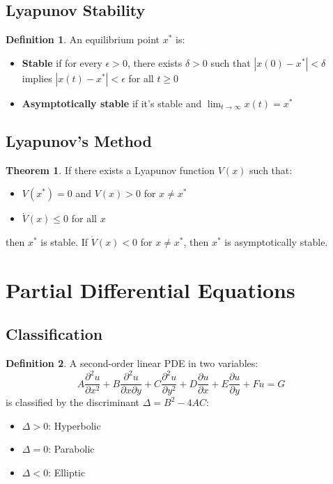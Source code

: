 \documentclass[11pt]{article}
\theoremstyle{definition}
\newtheorem{definition}{Definition}[section]
\newtheorem{theorem}{Theorem}[section]
\begin{document}
\subsection{Lyapunov Stability}
\begin{definition}
An equilibrium point $x^*$ is:
\begin{itemize}
    \item \textbf{Stable} if for every $\epsilon > 0$, there exists $\delta > 0$ such that $|x(0) - x^*| < \delta$ implies $|x(t) - x^*| < \epsilon$ for all $t \geq 0$
    \item \textbf{Asymptotically stable} if it's stable and $\lim_{t \to \infty} x(t) = x^*$
\end{itemize}
\end{definition}

\subsection{Lyapunov's Method}
\begin{theorem}
If there exists a Lyapunov function $V(x)$ such that:
\begin{itemize}
    \item $V(x^*) = 0$ and $V(x) > 0$ for $x \neq x^*$
    \item $\dot{V}(x) \leq 0$ for all $x$
\end{itemize}
then $x^*$ is stable. If $\dot{V}(x) < 0$ for $x \neq x^*$, then $x^*$ is asymptotically stable.
\end{theorem}

\section{Partial Differential Equations}

\subsection{Classification}
\begin{definition}
A second-order linear PDE in two variables:
$$A \frac{\partial^2 u}{\partial x^2} + B \frac{\partial^2 u}{\partial x \partial y} + C \frac{\partial^2 u}{\partial y^2} + D \frac{\partial u}{\partial x} + E \frac{\partial u}{\partial y} + Fu = G$$
is classified by the discriminant $\Delta = B^2 - 4AC$:
\begin{itemize}
    \item $\Delta > 0$: Hyperbolic
    \item $\Delta = 0$: Parabolic
    \item $\Delta < 0$: Elliptic
\end{itemize}
\end{definition}
\end{document}
